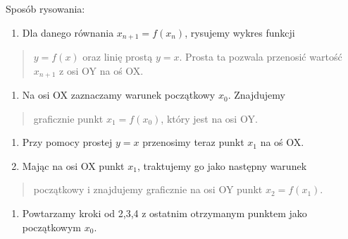 \documentclass[a4paper,12pt,polish]{sphinxmanual}
\begin{document}
Sposób rysowania:
\begin{enumerate}
\item {} 
Dla danego równania  $x_{n+1} = f(x_n)$, rysujemy wykres funkcji

\end{enumerate}
\begin{quote}

$y = f (x)$ oraz  linię prostą $y  = x$. Prosta ta pozwala
przenosić wartość $x_{n+1}$  z osi OY na oś OX.
\end{quote}
\begin{enumerate}
\item {} 
Na osi OX zaznaczamy warunek początkowy $x_0$. Znajdujemy

\end{enumerate}
\begin{quote}

graficznie punkt $x_1 = f(x_0)$, który jest na osi OY.
\end{quote}
\begin{enumerate}
\item {} 
Przy pomocy prostej $y=x$ przenosimy teraz  punkt $x_1$ na oś OX.

\item {} 
Mając na osi OX punkt $x_1$, traktujemy go jako następny warunek

\end{enumerate}
\begin{quote}

początkowy i znajdujemy graficznie na osi OY punkt $x_2=f(x_1)$.
\end{quote}
\begin{enumerate}
\item {} 
Powtarzamy kroki od 2,3,4 z ostatnim otrzymanym punktem jako początkowym $x_0$.

\end{enumerate}
\end{document}

